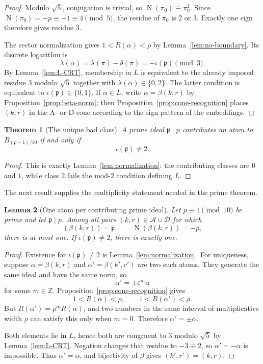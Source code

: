 \documentclass[12pt]{amsart}
\newtheorem{theorem}{Theorem}[section]
\newtheorem{lemma}[theorem]{Lemma}
\theoremstyle{definition}
\theoremstyle{remark}
\DeclareMathOperator{\N}{N}
\newcommand{\ZZ}{\mathbb{Z}}
\newcommand{\eps}{\varepsilon}
\newcommand{\Acone}{\mathcal{A}}
\newcommand{\Dcone}{\mathcal{D}}
\begin{document}
\begin{proof}
Modulo $\sqrt5$, conjugation is trivial, so
$\N(\pi_0)\equiv\pi_0^2$.  Since
$\N(\pi_0)=-p\equiv-1\equiv4\pmod5$, the residue of $\pi_0$ is
$2$ or $3$.  Exactly one sign therefore gives residue $3$.

The sector normalization gives $1<R(\alpha)<\rho$ by
Lemma~\ref{lem:no-boundary}.  Its discrete logarithm is
\[
  \lambda(\alpha)
  =\lambda(\pi)-\delta(\pi)
  =-\iota(\mathfrak p)\pmod3.
\]
By Lemma~\ref{lem:L-CRT}, membership in $L$ is equivalent to the
already imposed residue $3$ modulo $\sqrt5$ together with
$\lambda(\alpha)\in\{0,2\}$.  The latter condition is equivalent to
$\iota(\mathfrak p)\in\{0,1\}$.  If $\alpha\in L$, write
$\alpha=\beta(k,r)$ by Proposition~\ref{prop:beta-norm}; then
Proposition~\ref{prop:cone-recognition} places $(k,r)$ in the A- or
D-cone according to the sign pattern of the embeddings.
\end{proof}

\begin{theorem}[The unique bad class]\label{thm:bad-class}
A prime ideal $\mathfrak p\mid p$ contributes an atom to
$B_{(p-1)/10}$ if and only if
\[
  \iota(\mathfrak p)\neq2.
\]
\end{theorem}

\begin{proof}
This is exactly Lemma~\ref{lem:normalization}: the contributing classes
are $0$ and $1$, while class $2$ fails the mod-$2$ condition defining
$L$.
\end{proof}

The next result supplies the multiplicity statement needed in the
prime theorem.

\begin{lemma}[One atom per contributing prime ideal]
\label{lem:one-atom}
Let $p\equiv1\pmod{10}$ be prime and let $\mathfrak p\mid p$.  Among
all pairs $(k,r)\in\Acone\cup\Dcone$ for which
\[
  (\beta(k,r))=\mathfrak p,
  \qquad
  \N(\beta(k,r))=-p,
\]
there is at most one.  If $\iota(\mathfrak p)\neq2$, there is exactly
one.
\end{lemma}

\begin{proof}
Existence for $\iota(\mathfrak p)\neq2$ is
Lemma~\ref{lem:normalization}.  For uniqueness, suppose
$\alpha=\beta(k,r)$ and $\alpha'=\beta(k',r')$ are two such atoms.
They generate the same ideal and have the same norm, so
\[
  \alpha'=\pm\eps^m\alpha
\]
for some $m\in\ZZ$.  Proposition~\ref{prop:cone-recognition} gives
\[
  1<R(\alpha)<\rho,
  \qquad
  1<R(\alpha')<\rho.
\]
But
$R(\alpha')=\rho^mR(\alpha)$, and two numbers in the same interval of
multiplicative width $\rho$ can satisfy this only when $m=0$.
Therefore $\alpha'=\pm\alpha$.

Both elements lie in $L$, hence both are congruent to $3$ modulo
$\sqrt5$ by Lemma~\ref{lem:L-CRT}.  Negation changes that residue to
$-3\equiv2$, so $\alpha'=-\alpha$ is impossible.  Thus
$\alpha'=\alpha$, and bijectivity of $\beta$ gives
$(k',r')=(k,r)$.
\end{proof}
\end{document}
